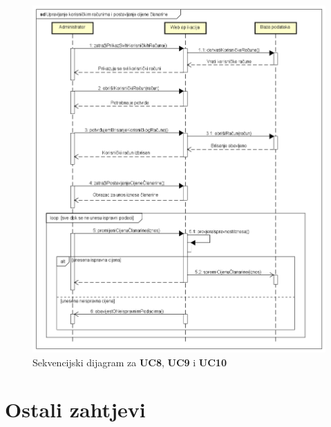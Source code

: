 				\begin{figure}[H]
					\includegraphics[width=\textwidth]{dijagrami/sd4.PNG}
					\centering
					\vspace{-0.7cm}
					\caption{Sekvencijski dijagram za \textbf{UC8}, \textbf{UC9} i \textbf{UC10}}
					\label{fig:promjene}
				\end{figure}
				
				\vspace{-0.5cm}
				
				\newpage
	
		\section{Ostali zahtjevi}
		
